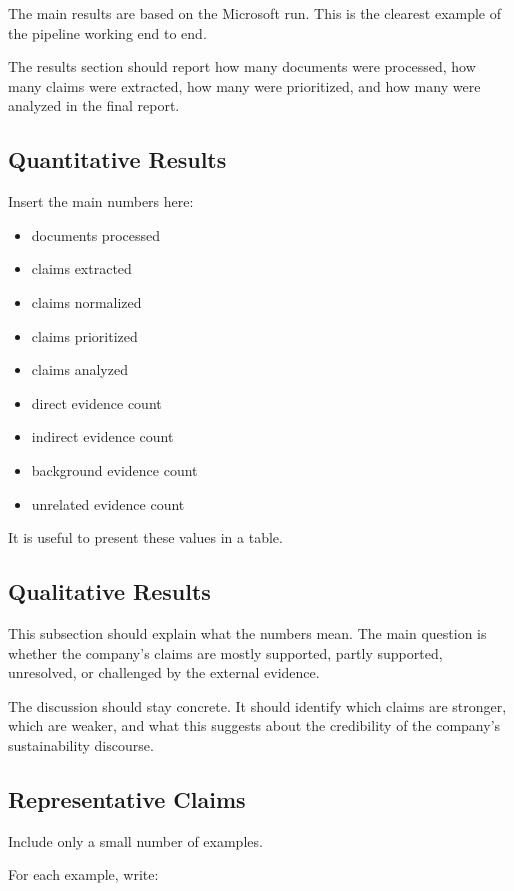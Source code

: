 The main results are based on the Microsoft run. This is the clearest example of the pipeline working end to end.

The results section should report how many documents were processed, how many claims were extracted, how many were prioritized, and how many were analyzed in the final report.

\subsection{Quantitative Results}

Insert the main numbers here:

\begin{itemize}
    \item documents processed
    \item claims extracted
    \item claims normalized
    \item claims prioritized
    \item claims analyzed
    \item direct evidence count
    \item indirect evidence count
    \item background evidence count
    \item unrelated evidence count
\end{itemize}

It is useful to present these values in a table.

\subsection{Qualitative Results}

This subsection should explain what the numbers mean. The main question is whether the company's claims are mostly supported, partly supported, unresolved, or challenged by the external evidence.

The discussion should stay concrete. It should identify which claims are stronger, which are weaker, and what this suggests about the credibility of the company's sustainability discourse.

\subsection{Representative Claims}

Include only a small number of examples.

For each example, write:

